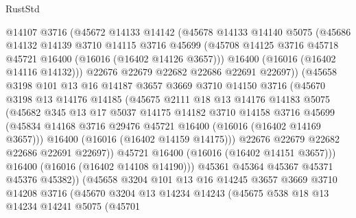 \begin{lexlean}{RustStd}
\begin{coremodule}
              @14107
              @3716
              (@45672
                @14133
                @14142
                (@45678
                  @14133
                  @14140
                  @5075
                  (@45686
                    @14132
                    @14139
                    @3710
                    @14115
                    @3716
                    @45699
                    (@45708 @14125 @3716 @45718 @45721 @16400 (@16016 (@16402 @14126 @3657)))
                    @16400
                    (@16016 (@16402 @14116 @14132)))
                  @22676
                  @22679
                  @22682
                  @22686
                  @22691
                  @22697))
              (@45658
                @3198
                @101
                @13
                @16
                @14187
                @3657
                @3669
                @3710
                @14150
                @3716
                (@45670
                  @3198
                  @13
                  @14176
                  @14185
                  (@45675
                    @2111
                    @18
                    @13
                    @14176
                    @14183
                    @5075
                    (@45682
                      @345
                      @13
                      @17
                      @5037
                      @14175
                      @14182
                      @3710
                      @14158
                      @3716
                      @45699
                      (@45834 @14168 @3716 @29476 @45721 @16400 (@16016 (@16402 @14169 @3657)))
                      @16400
                      (@16016 (@16402 @14159 @14175)))
                    @22676
                    @22679
                    @22682
                    @22686
                    @22691
                    @22697))
                @45721
                @16400
                (@16016 (@16402 @14151 @3657)))
              @16400
              (@16016 (@16402 @14108 @14190)))
            @45361
            @45364
            @45367
            @45371
            @45376
            @45382))
        (@45658
          @3204
          @101
          @13
          @16
          @14245
          @3657
          @3669
          @3710
          @14208
          @3716
          (@45670
            @3204
            @13
            @14234
            @14243
            (@45675
              @538
              @18
              @13
              @14234
              @14241
              @5075
              (@45701

\end{coremodule}
\end{lexlean}
